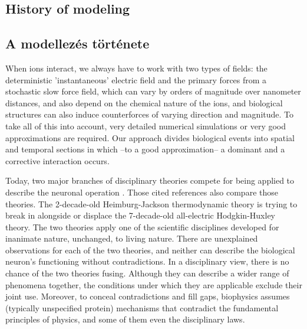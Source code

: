\ifx\magyar\undefined

\subsection[History of modeling]{History of modeling\label{sec:Model-History}}

\else

\subsection[A modellezés története]{A modellezés története\label{sec:Model-History}}
\fi

\ifx\magyar\undefined
When ions interact, we always have to work with two types of fields: the deterministic 'instantaneous' electric field
and the primary forces from a stochastic slow force field,
which can vary by orders of magnitude over nanometer distances, and also depend on the chemical nature of the ions, and biological structures can also induce counterforces of varying
direction and magnitude.
To take all of this into account, very detailed numerical
simulations or very good approximations are required. Our approach
divides biological events into spatial and temporal sections in which --to a good approximation-- a dominant and a corrective interaction occurs.

Today, two major branches of disciplinary theories compete
for being applied to describe the neuronal operation \cite{CriticalElectricity:2018,ThermodynamicAPDrukarch:2022,PerspectivesNerveSignalPropagation:2024,ComparisonHHandSoliton:2010,HH_Potential_Controversies_2017,PiezoelectricNeuron:2025}. Those cited references also compare those theories.
The 2-decade-old Heimburg-Jackson thermodynamic theory is trying to break in alongside or displace the 7-decade-old all-electric Hodgkin-Huxley theory. The two theories apply one of the scientific disciplines developed for inanimate nature, unchanged, to living nature. There are unexplained observations for each of the two theories, and neither can describe the biological neuron's functioning without contradictions. 
In a disciplinary view, there is no chance of the two theories fusing. Although they can describe a wider range of phenomena together, the conditions under which they are applicable exclude their joint use. Moreover, to conceal contradictions and fill gaps, biophysics assumes (typically unspecified protein) mechanisms that contradict the fundamental principles of physics, and some of them even the disciplinary laws.

